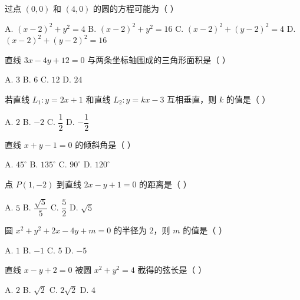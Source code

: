 \documentclass[11pt, a4paper]{article}
\begin{document}
\begin{baitap}[2]
过点 $(0,0)$ 和 $(4,0)$ 的圆的方程可能为（ ）
\par\vspace{3pt}
\noindent A. $(x - 2)^2 + y^2 = 4$ \quad B. $(x - 2)^2 + y^2 = 16$ \quad C. $(x - 2)^2 + (y - 2)^2 = 4$ \quad D. $(x - 2)^2 + (y - 2)^2 = 16$
\end{baitap}

\begin{baitap}[3]
直线 $3x - 4y + 12 = 0$ 与两条坐标轴围成的三角形面积是（ ）
\par\vspace{3pt}
\noindent A. $3$ \quad B. $6$ \quad C. $12$ \quad D. $24$
\end{baitap}

\begin{baitap}[4]
若直线 $L_1: y = 2x + 1$ 和直线 $L_2: y = kx - 3$ 互相垂直，则 $k$ 的值是（ ）
\par\vspace{3pt}
\noindent A. $2$ \quad B. $-2$ \quad C. $\dfrac{1}{2}$ \quad D. $-\dfrac{1}{2}$
\end{baitap}

\begin{baitap}[5]
直线 $x + y - 1 = 0$ 的倾斜角是（ ）
\par\vspace{3pt}
\noindent A. $45^\circ$ \quad B. $135^\circ$ \quad C. $90^\circ$ \quad D. $120^\circ$
\end{baitap}

\begin{baitap}[6]
点 $P(1,-2)$ 到直线 $2x - y + 1 = 0$ 的距离是（ ）
\par\vspace{3pt}
\noindent A. $5$ \quad B. $\dfrac{\sqrt{5}}{5}$ \quad C. $\dfrac{5}{2}$ \quad D. $\sqrt{5}$
\end{baitap}

\begin{baitap}[7]
圆 $x^2 + y^2 + 2x - 4y + m = 0$ 的半径为 $2$，则 $m$ 的值是（ ）
\par\vspace{3pt}
\noindent A. $1$ \quad B. $-1$ \quad C. $5$ \quad D. $-5$
\end{baitap}

\begin{baitap}[8]
直线 $x - y + 2 = 0$ 被圆 $x^2 + y^2 = 4$ 截得的弦长是（ ）
\par\vspace{3pt}
\noindent A. $2$ \quad B. $\sqrt{2}$ \quad C. $2\sqrt{2}$ \quad D. $4$
\end{baitap}
\end{document}
